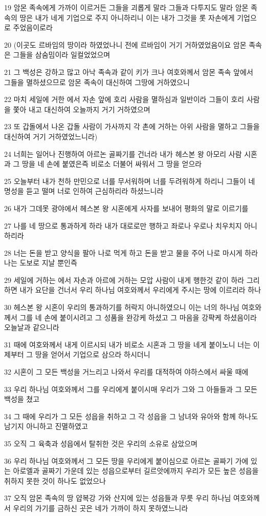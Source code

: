 \par 19 암몬 족속에게 가까이 이르거든 그들을 괴롭게 말라 그들과 다투지도 말라 암몬 족속의 땅은 내가 네게 기업으로 주지 아니하리니 이는 내가 그것을 롯 자손에게 기업으로 주었음이로라
\par 20 (이곳도 르바임의 땅이라 하였었나니 전에 르바임이 거기 거하였었음이요 암몬 족속은 그들을 삼숨밈이라 일컬었었으며
\par 21 그 백성은 강하고 많고 아낙 족속과 같이 키가 크나 여호와께서 암몬 족속 앞에서 그들을 멸하셨으므로 암몬 족속이 대신하여 그땅에 거하였으니
\par 22 마치 세일에 거한 에서 자손 앞에 호리 사람을 멸하심과 일반이라 그들이 호리 사람을 쫓아 내고 대신하여 오늘까지 거기 거하였으며
\par 23 또 갑돌에서 나온 갑돌 사람이 가사까지 각 촌에 거하는 아위 사람을 멸하고 그들을 대신하여 거기 거하였었느니라)
\par 24 너희는 일어나 진행하여 아르논 골짜기를 건너라 내가 헤스본 왕 아모리 사람 시혼과 그 땅을 네 손에 붙였은즉 비로소 더불어 싸워서 그 땅을 얻으라
\par 25 오늘부터 내가 천하 만민으로 너를 무서워하며 너를 두려워하게 하리니 그들이 네 명성을 듣고 떨며 너로 인하여 근심하리라 하셨느니라
\par 26 내가 그데못 광야에서 헤스본 왕 시혼에게 사자를 보내어 평화의 말로 이르기를
\par 27 나를 네 땅으로 통과하게 하라 내가 대로로만 행하고 좌로나 우로나 치우치지 아니하리라
\par 28 너는 돈을 받고 양식을 팔아 나로 먹게 하고 돈을 받고 물을 주어 나로 마시게 하라 나는 도보로 지날 뿐인즉
\par 29 세일에 거하는 에서 자손과 아르에 거하는 모압 사람이 내게 행한것 같이 하라 그리하면 내가 요단을 건너서 우리 하나님 여호와께서 우리에게 주시는 땅에 이르리라 하나
\par 30 헤스본 왕 시혼이 우리의 통과하기를 허락지 아니하였으니 이는 너의 하나님 여호와께서 그를 네 손에 붙이시려고 그 성품을 완강케 하셨고 그 마음을 강퍅케 하셨음이라 오늘날과 같으니라
\par 31 때에 여호와께서 내게 이르시되 내가 비로소 시혼과 그 땅을 네게 붙이노니 너는 이제부터 그 땅을 얻어서 기업으로 삼으라 하시더니
\par 32 시혼이 그 모든 백성을 거느리고 나와서 우리를 대적하여 야하스에서 싸울 때에
\par 33 우리 하나님 여호와께서 그를 우리에게 붙이시매 우리가 그와 그 아들들과 그 모든 백성을 쳤고
\par 34 그 때에 우리가 그 모든 성읍을 취하고 그 각 성읍을 그 남녀와 유아와 함께 하나도 남기지 아니하고 진멸하였고
\par 35 오직 그 육축과 성읍에서 탈취한 것은 우리의 소유로 삼았으며
\par 36 우리 하나님 여호와께서 그 모든 땅을 우리에게 붙이심으로 아르논 골짜기 가에 있는 아로엘과 골짜기 가운데 있는 성읍으로부터 길르앗에까지 우리가 모든 높은 성읍을 취하지 못한 것이 하나도 없었으나
\par 37 오직 암몬 족속의 땅 얍복강 가와 산지에 있는 성읍들과 무릇 우리 하나님 여호와께서 우리의 가기를 금하신 곳은 네가 가까이 하지 못하였느니라


